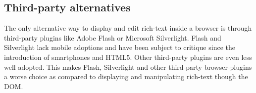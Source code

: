 
\subsection{Third-party alternatives}

The only alternative way to display and edit rich-text inside a browser is through third-party plugins like Adobe Flash or Microsoft Silverlight. Flash and Silverlight lack mobile adoptions and have been subject to critique since the introduction of smartphones and HTML5. Other third-party plugins are even less well adopted. This makes Flash, Silverlight and other third-party browser-plugins a worse choice as compared to displaying and manipulating rich-text though the DOM.